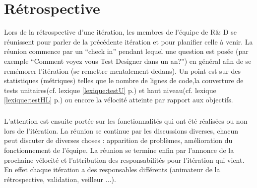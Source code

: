 \section{Rétrospective}
Lors de la rétrospective d'une itération, les membres de l'équipe de R\& D se réunissent pour parler de la précédente itération et pour planifier celle à venir. La réunion commence par un ``check in'' pendant lequel une question est posée (par exemple ``Comment voyez vous Test Designer dans un an?'') en général afin de se remémorer l'itération (se remettre mentalement dedans). Un point est sur des statistiques (métriques) telles que le nombre de lignes de code,la couverture de tests unitaires(cf. lexique \ref{lexique:testU} p.\pageref{lexique:testU}) et haut niveau(cf. lexique \ref{lexique:testHL} p.\pageref{lexique:testHL}) ou encore la vélocité atteinte par rapport aux objectifs.
\subparagraph*{}
L'attention est ensuite portée sur les fonctionnalités qui ont été réalisées ou non lors de l'itération. La réunion se continue par les discussions diverses, chacun peut discuter de diverses choses : apparition de problèmes, amélioration du fonctionnement de l'équipe. La réunion se termine enfin par l'annonce de la prochaine vélocité et l'attribution des responsabilités pour l'itération qui vient. En effet chaque itération a des responsables différents (animateur de la rétrospective, validation, veilleur ...).
